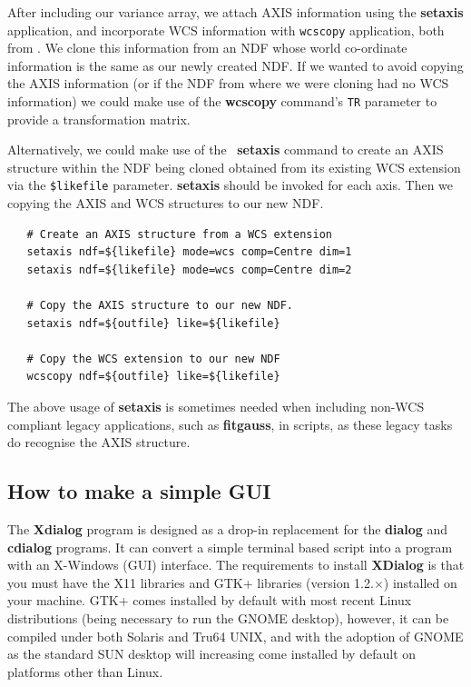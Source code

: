 \documentclass[twoside,11pt]{article}
\newcommand{\htmladdnormallink}[2]{#1}
\newcommand{\xref}[3]{#1}
\newcommand{\xlabel}[1]{}
\begin{document}
\begin{\htmlonly}
{After including our variance array, we attach AXIS information using
the \xref{{\bf setaxis}}{sun95}{SETAXIS} application, and incorporate WCS
information with \xref{{\tt wcscopy}}{sun95}{WCSCOPY} application, both from
\KAPPA.  We clone this information from an NDF whose world co-ordinate
information is the same as our newly created NDF.  If we wanted to
avoid copying the AXIS information (or if the NDF from where we were
cloning had no WCS information) we could make use of the
\xref{{\bf wcscopy}}{sun95}{WCSCOPY} command's {\tt TR} parameter to provide
a transformation matrix.  

\label{sc16_wcs2axis}\xlabel{sc16_wcs2axis}
Alternatively, we could make use of the \KAPPA\ {\bf setaxis} command
to create an AXIS structure within the NDF being cloned obtained from
its existing WCS extension via the
\verb+$likefile+ parameter.  {\bf setaxis} should be invoked for each
axis.  Then we copying the AXIS and WCS structures to our new NDF.

\small\begin{verbatim}
   # Create an AXIS structure from a WCS extension
   setaxis ndf=${likefile} mode=wcs comp=Centre dim=1
   setaxis ndf=${likefile} mode=wcs comp=Centre dim=2
   
   # Copy the AXIS structure to our new NDF.
   setaxis ndf=${outfile} like=${likefile}
   
   # Copy the WCS extension to our new NDF
   wcscopy ndf=${outfile} like=${likefile}
\end{verbatim}\normalsize

The above usage of {\bf setaxis} is sometimes needed when including non-WCS
compliant legacy applications, such as
\xref{{\bf fitgauss}}{sun86}{FITGAUSS}, in scripts, as these legacy tasks do
recognise the AXIS structure.

\subsection{\xlabel{sc16_xdialog}How to make a simple GUI\label{sc16_xdialog}}

The \htmladdnormallink{{\bf Xdialog}}{http://xdialog.dyns.net/} program
is designed as a drop-in replacement for the {\bf dialog} and {\bf
cdialog} programs.  It can convert a simple terminal based script into
a program with an X-Windows (GUI) interface.  The requirements to
install {\bf XDialog} is that you must have the X11 libraries and
\htmladdnormallink{GTK+ libraries}{http://www.gtk.org} (version
1.2.$\times$) installed on your machine.  GTK+ comes installed by
default with most recent Linux distributions (being necessary to run
the {{\footnotesize GNOME}\normalsize} desktop), however, it can be
compiled under both Solaris and Tru64 UNIX, and with the adoption of
{{\footnotesize GNOME}\normalsize} as the standard SUN desktop will
increasing come installed by default on platforms other than Linux.

}
\end{\htmlonly}
\end{document}
